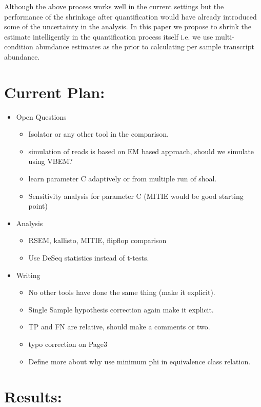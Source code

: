 \documentclass{article}
\begin{document}
Although the above process works well in the current settings but the performance of the shrinkage after quantification would have
already introduced some of the uncertainty in the analysis. In this paper we propose to shrink the estimate intelligently in the
quantification process itself i.e. we use multi-condition abundance estimates as the prior to calculating per sample transcript abundance. 


\section{Current Plan:}
\begin{itemize}
	\item Open Questions
		\begin{itemize}
			\item Isolator or any other tool in the comparison.
			\item simulation of reads is based on EM based approach, should we simulate using VBEM?
			\item learn parameter C adaptively or from multiple run of shoal.
			\item Sensitivity analysis for parameter C (MITIE would be good starting point)
		\end{itemize}
	\item Analysis
	\begin{itemize}
		\item RSEM, kallisto, MITIE, flipflop comparison
		\item Use DeSeq statistics instead of t-tests.
	\end{itemize}
	\item Writing
	\begin{itemize}
		\item No other tools have done the same thing (make it explicit).
		\item Single Sample hypothesis correction again make it explicit.
		\item TP and FN are relative, should make a comments or two.
		\item typo correction on Page3
		\item Define more about why use minimum phi in equivalence class relation.
	\end{itemize}
\end{itemize}

\section{Results:}



\end{document}
